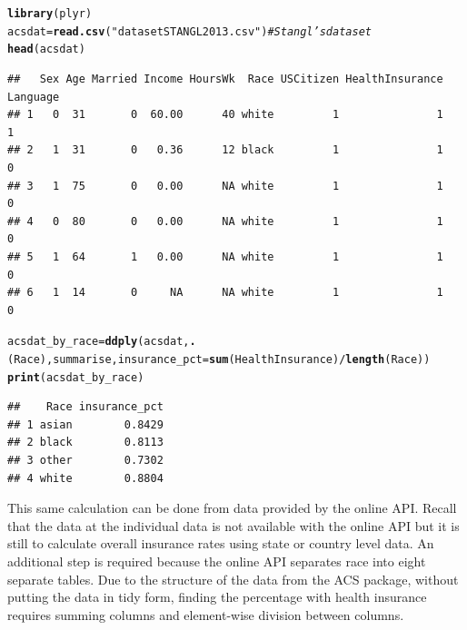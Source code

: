 \documentclass{article}\usepackage[]{graphicx}\usepackage[]{color}
\makeatletter
\newcommand{\hlstr}[1]{\textcolor[rgb]{0.192,0.494,0.8}{#1}}%
\newcommand{\hlcom}[1]{\textcolor[rgb]{0.678,0.584,0.686}{\textit{#1}}}%
\newcommand{\hlopt}[1]{\textcolor[rgb]{0,0,0}{#1}}%
\newcommand{\hlstd}[1]{\textcolor[rgb]{0.345,0.345,0.345}{#1}}%
\newcommand{\hlkwb}[1]{\textcolor[rgb]{0.69,0.353,0.396}{#1}}%
\newcommand{\hlkwc}[1]{\textcolor[rgb]{0.333,0.667,0.333}{#1}}%
\newcommand{\hlkwd}[1]{\textcolor[rgb]{0.737,0.353,0.396}{\textbf{#1}}}%
\newenvironment{kframe}{%
 \def\at@end@of@kframe{}%
 \ifinner\ifhmode%
  \def\at@end@of@kframe{\end{minipage}}%
  \begin{minipage}{\columnwidth}%
 \fi\fi%
 \def\FrameCommand##1{\hskip\@totalleftmargin \hskip-\fboxsep
 \colorbox{shadecolor}{##1}\hskip-\fboxsep
     \hskip-\linewidth \hskip-\@totalleftmargin \hskip\columnwidth}%
 \MakeFramed {\advance\hsize-\width
   \@totalleftmargin\z@ \linewidth\hsize
   \@setminipage}}%
 {\par\unskip\endMakeFramed%
 \at@end@of@kframe}
\newenvironment{knitrout}{}{} %
\makeatother
\begin{document}
\begin{knitrout}
\color{fgcolor}\begin{kframe}
\begin{alltt}
\hlkwd{library}\hlstd{(plyr)}
\hlstd{acsdat} \hlkwb{=} \hlkwd{read.csv}\hlstd{(}\hlstr{"datasetSTANGL2013.csv"}\hlstd{)}  \hlcom{#Stangl's dataset}
\hlkwd{head}\hlstd{(acsdat)}
\end{alltt}
\begin{verbatim}
##   Sex Age Married Income HoursWk  Race USCitizen HealthInsurance Language
## 1   0  31       0  60.00      40 white         1               1        1
## 2   1  31       0   0.36      12 black         1               1        0
## 3   1  75       0   0.00      NA white         1               1        0
## 4   0  80       0   0.00      NA white         1               1        0
## 5   1  64       1   0.00      NA white         1               1        0
## 6   1  14       0     NA      NA white         1               1        0
\end{verbatim}
\begin{alltt}
\hlstd{acsdat_by_race} \hlkwb{=} \hlkwd{ddply}\hlstd{(acsdat,} \hlkwd{.}\hlstd{(Race), summarise,} \hlkwc{insurance_pct} \hlstd{=} \hlkwd{sum}\hlstd{(HealthInsurance)}\hlopt{/}\hlkwd{length}\hlstd{(Race))}
\hlkwd{print}\hlstd{(acsdat_by_race)}
\end{alltt}
\begin{verbatim}
##    Race insurance_pct
## 1 asian        0.8429
## 2 black        0.8113
## 3 other        0.7302
## 4 white        0.8804
\end{verbatim}
\end{kframe}
\end{knitrout}

This same calculation can be done from data provided by the online API.  Recall that the data at the individual data is not available with the online API but it is still to calculate overall insurance rates using state or country level data.  An additional step is required because the online API separates race into eight separate tables.  Due to the structure of the data from the ACS package, without putting the data in tidy form, finding the percentage with health insurance requires summing columns and element-wise division between columns.  
\end{document}
